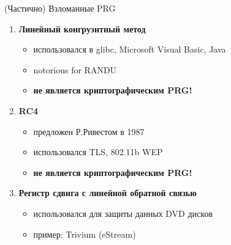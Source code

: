 \documentclass[usenames,dvipsnames,8pt,aspectratio=169]{beamer}
\begin{document}
\begin{frame}{(Частично) Взломанные PRG}
\LARGE
\begin{enumerate}
	\itemsep1.5em 
	\item {\color{Orange}\textbf{Линейный конгруэнтный метод}} 
	\begin{itemize}
		\LARGE
				\itemsep5pt  
		\item использовался в glibc, Microsoft Visual Basic, Java
		\item notorious for RANDU
		\item \textbf{не является криптографическим PRG!}
	\end{itemize}

	\item {\color{Orange}\textbf{RC4}} 
	\begin{itemize}
		\LARGE
		\itemsep5pt 
		\item предложен Р.Ривестом в 1987
		\item использовался TLS, 802.11b WEP
		\item \textbf{не является криптографическим PRG!}
	\end{itemize}

	\item {\color{Orange}\textbf{Регистр сдвига с линейной обратной связью }}
	\begin{itemize}
			\LARGE
			\itemsep5pt
		\item использовался для защиты данных DVD дисков
		\item пример: Trivium (eStream)
	\end{itemize} 
\end{enumerate}

\end{frame}
\end{document}
